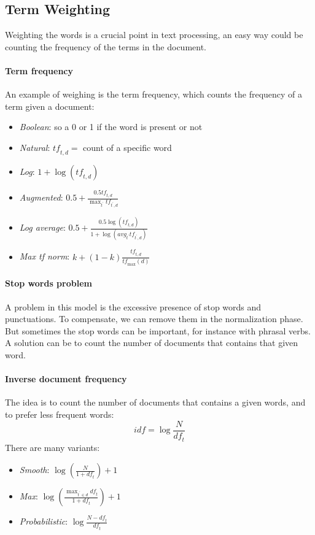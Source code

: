 \subsection{Term Weighting}
Weighting the words is a crucial point in text processing, 
an easy way could be counting the frequency of the terms in the document.

\paragraph{Term frequency}
An example of weighing is the term frequency, 
which counts the frequency of a term given a document:
\begin{itemize}
    \item \emph{Boolean}: so a 0 or 1 if the word is present or not
    \item \emph{Natural}: $\mathit{tf}_{t,d} = $  count of a specific word
    \item \emph{Log}: $1 + \log(\mathit{tf}_{t,d})$
    \item \emph{Augmented}: $0.5 + \frac{0.5\mathit{tf}_{t,d}}{\max_{t^\prime} \mathit{tf}_{t^\prime,d}}$
    \item \emph{Log average}:  $0.5 + \frac{0.5 \log(\mathit{tf}_{t,d})}{1 + \log(\mathit{avg}_{t^\prime} \mathit{tf}_{t^\prime,d})}$
    \item \emph{Max tf norm}: $k + (1-k)\frac{\mathit{tf}_{t,d}}{\mathit{tf}_{\max}(d)}$
\end{itemize}

\paragraph{Stop words problem}
A problem in this model is the excessive presence of stop words and punctuations.
To compensate, we can remove them in the normalization phase. \\
But sometimes the stop words can be important, for instance with phrasal verbs.
A solution can be to count the number of documents that contains that given word.

\paragraph{Inverse document frequency}
The idea is to count the number of documents that contains a 
given words, and to prefer less frequent words: $$\mathit{idf} = \log\frac{N}{\mathit{df}_t}$$
There are many variants: 
\begin{itemize}
    \item \emph{Smooth}: $\log(\frac{N}{1 + \mathit{df}_t}) + 1$
    \item \emph{Max}: $\log(\frac{\max_{t^\prime \in d} \mathit{df}_t}{1 + \mathit{df}_t}) + 1$
    \item \emph{Probabilistic}: $\log \frac{N - \mathit{df}_t}{\mathit{df}_t}$
\end{itemize}

